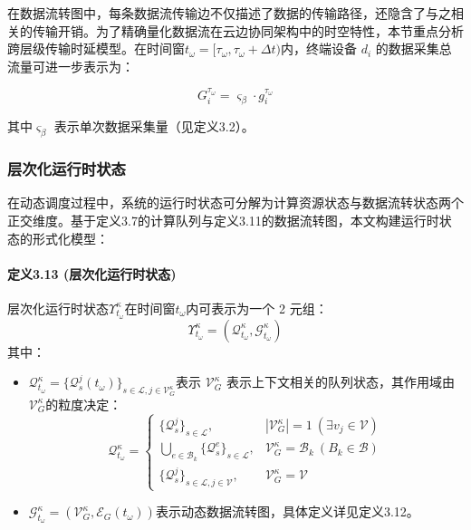 在数据流转图中，每条数据流传输边不仅描述了数据的传输路径，还隐含了与之相关的传输开销。为了精确量化数据流在云边协同架构中的时空特性，本节重点分析跨层级传输时延模型。在时间窗$t_\omega = [\tau_\omega, \tau_\omega + \Delta t)$内，终端设备 $d_i$ 的数据采集总流量可进一步表示为：

\begin{equation}
G_i^{\tau_\omega} = \varsigma_\beta \cdot g_i^{\tau_\omega}
\end{equation}

其中$\varsigma_\beta$ 表示单次数据采集量（见定义3.2）。

\subsubsection{层次化运行时状态}

在动态调度过程中，系统的运行时状态可分解为计算资源状态与数据流转状态两个正交维度。基于定义3.7的计算队列与定义3.11的数据流转图，本文构建运行时状态的形式化模型：

\paragraph{定义3.13 (层次化运行时状态)} 层次化运行时状态$\Upsilon_{t_\omega}^κ$在时间窗$t_\omega$内可表示为一个 2 元组：
\[
\Upsilon_{t_\omega}^κ = (\mathcal{Q}_{t_\omega}^κ, \mathcal{G}_{t_\omega}^κ)
\]
其中：
\begin{itemize}
    \item $\mathcal{Q}_{t_\omega}^κ = \{\mathcal{Q}_s^j(t_\omega)\}_{s \in \mathcal{L}, j \in \mathcal{V}_G^κ}$表示 $\mathcal{V}_G^κ$ 表示上下文相关的队列状态，其作用域由$\mathcal{V}_G^κ$的粒度决定：
        \[
        \mathcal{Q}_{t_\omega}^κ = 
        \begin{cases}
            \{\mathcal{Q}_s^j\}_{s \in \mathcal{L}}, & |\mathcal{V}_G^κ|=1 \ (\exists v_j \in \mathcal{V}) \\
            \bigcup_{e \in \mathcal{B}_k} \{\mathcal{Q}_s^e\}_{s \in \mathcal{L}}, & \mathcal{V}_G^κ = \mathcal{B}_k \ (B_k \in \mathcal{B}) \\
            \{\mathcal{Q}_s^j\}_{s \in \mathcal{L}, j \in \mathcal{V}}, & \mathcal{V}_G^κ = \mathcal{V}
        \end{cases}
        \]
    \item $\mathcal{G}_{t_\omega}^κ = (\mathcal{V}_G^κ, \mathcal{E}_G(t_\omega))$表示动态数据流转图，具体定义详见定义3.12。
\end{itemize}

